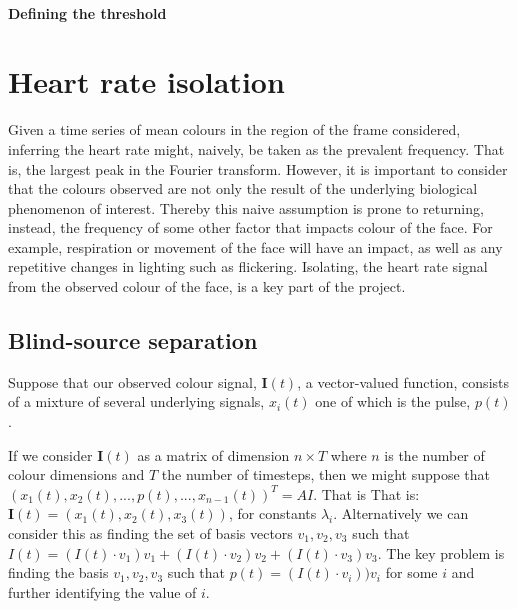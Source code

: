 






\paragraph{Defining the threshold}





\section{Heart rate isolation}
Given a time series of mean colours in the region of the frame considered, inferring the heart rate might, naively, be taken as the prevalent frequency. That is, the largest peak in the Fourier transform. However, it is important to consider that the colours observed are not only the result of the underlying biological phenomenon of interest. Thereby this naive assumption is prone to returning, instead, the frequency of some other factor that impacts colour of the face. For example, respiration or movement of the face will have an impact, as well as any repetitive changes in lighting such as flickering. Isolating, the heart rate signal from the observed colour of the face, is a key part of the project.

\subsection{Blind-source separation}
Suppose that our observed colour signal, $\mathbf{I}(t)$, a vector-valued function, consists of a mixture of several underlying signals, $x_i(t)$ one of which is the pulse, $p(t)$. 

If we consider $\mathbf{I}(t)$ as a matrix of dimension $n \times T$ where $n$ is the number of colour dimensions and $T$ the number of timesteps, then we might suppose that $ (x_1(t), x_2(t), ..., p(t), ..., x_{n-1}(t))^T = AI$. That is 
That is: $\mathbf{I}(t) = (x_1(t), x_2(t), x_3(t))$, for constants $\lambda_i$. 
Alternatively we can consider this as finding the set of basis vectors $v_1, v_2, v_3$ such that $I(t) = (I(t)\cdot v_1)v_1 + (I(t) \cdot v_2)v_2 + (I(t) \cdot v_3)v_3$. The key problem is finding the basis $v_1, v_2, v_3$ such that $p(t) = (I(t)\cdot v_i))v_i$ for some $i$ and further identifying the value of $i$.

